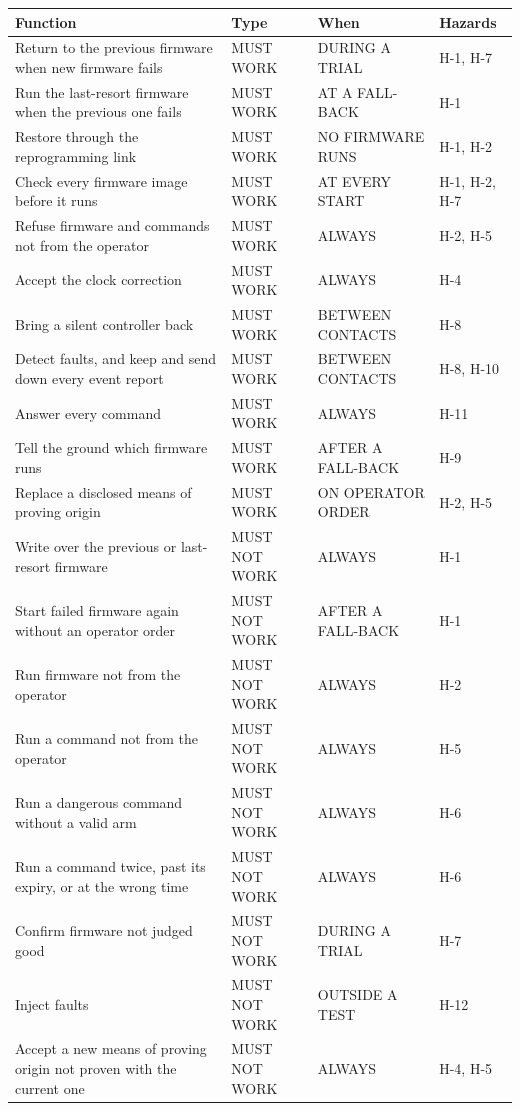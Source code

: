 \documentclass[11pt,a4paper]{article}
\begin{document}
{\small
\begin{xltabular}{\textwidth}{@{}>{\raggedright\arraybackslash}Xlll@{}}
\toprule
Function & Type & When & Hazards \\
\midrule
\endhead
Return to the previous firmware when new firmware fails & MUST WORK & DURING A TRIAL & H-1, H-7 \\
Run the last-resort firmware when the previous one fails & MUST WORK & AT A FALL-BACK & H-1 \\
Restore through the reprogramming link & MUST WORK & NO FIRMWARE RUNS & H-1, H-2 \\
Check every firmware image before it runs & MUST WORK & AT EVERY START & H-1, H-2, H-7 \\
Refuse firmware and commands not from the operator & MUST WORK & ALWAYS & H-2, H-5 \\
Accept the clock correction & MUST WORK & ALWAYS & H-4 \\
Bring a silent controller back & MUST WORK & BETWEEN CONTACTS & H-8 \\
Detect faults, and keep and send down every event report & MUST WORK & BETWEEN CONTACTS & H-8, H-10 \\
Answer every command & MUST WORK & ALWAYS & H-11 \\
Tell the ground which firmware runs & MUST WORK & AFTER A FALL-BACK & H-9 \\
Replace a disclosed means of proving origin & MUST WORK & ON OPERATOR ORDER & H-2, H-5 \\
Write over the previous or last-resort firmware & MUST NOT WORK & ALWAYS & H-1 \\
Start failed firmware again without an operator order & MUST NOT WORK & AFTER A FALL-BACK & H-1 \\
Run firmware not from the operator & MUST NOT WORK & ALWAYS & H-2 \\
Run a command not from the operator & MUST NOT WORK & ALWAYS & H-5 \\
Run a dangerous command without a valid arm & MUST NOT WORK & ALWAYS & H-6 \\
Run a command twice, past its expiry, or at the wrong time & MUST NOT WORK & ALWAYS & H-6 \\
Confirm firmware not judged good & MUST NOT WORK & DURING A TRIAL & H-7 \\
Inject faults & MUST NOT WORK & OUTSIDE A TEST & H-12 \\
Accept a new means of proving origin not proven with the current one & MUST NOT WORK & ALWAYS & H-4, H-5 \\
\bottomrule
\end{xltabular}}
\end{document}
